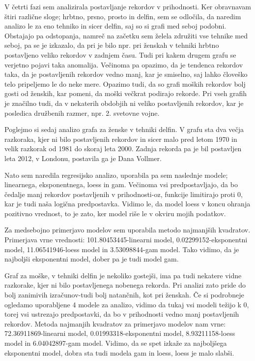 \documentclass[11pt,a4paper]{article}
\begin{document}
V četrti fazi sem analizirala postavljanje rekordov v prihodnosti. Ker obravnavam štiri različne sloge; hrbtno, prsno, prosto in delfin, sem se odločila, da naredim analizo le za eno tehniko in sicer delfin, saj so si grafi med seboj podobni. Obstajajo pa odstopanja, namreč na začetku sem želela združiti vse tehnike med seboj, pa se je izkazalo, da pri je bilo npr. pri ženskah v tehniki hrbtno postavljeno veliko rekordov v zadnjem času. Tudi pri kakem drugem grafu se verjetno pojavi taka anomalija. Večinoma pa opazimo, da je tendenca rekordov taka, da je postavljenih rekordov vedno manj, kar je smiselno, saj lahko človeško telo pripeljemo le do neke mere. Opazimo tudi, da so grafi moških rekordov bolj gosti od ženskih, kar pomeni, da moški večkrat podirajo rekorde. Pri vseh grafih je značilno tudi, da v nekaterih obdobjih ni veliko postavljenih rekordov, kar je posledica družbenih razmer, npr. 2. svetovne vojne.

Poglejmo si sedaj analizo grafa za ženske v tehniki delfin. V grafu sta dva večja razkoraka, kjer ni bilo postavljenih rekordov in sicer malo pred letom 1970 in velik razkorak od 1981 do skoraj leta 2000. Zadnja rekorda pa je bil postavljen leta 2012, v Londonu, postavila ga je Dana Vollmer.

Nato sem naredila regresijsko analizo, uporabila pa sem naslednje modele; linearnega, eksponentnega, loess in gam. Večinoma vsi predpostavljajo, da bo čedalje manj rekordov postavljenih v prihodnosti-oz, funkcije limitirajo proti 0, kar je tudi naša logična predpostavka. Vidimo le, da model loess v koncu ohranja pozitivno vrednost, to je zato, ker model riše le v okviru mojih podatkov.

Za medsebojno primerjavo modelov sem uporabila metodo najmanjših kvadratov. Primerjava vrne vrednosti: 101.80453445-linearni model, 0.02299152-eksponentni model,  11.06541946-loess model in  3.53098844-gam model. Tako vidimo, da je najboljši eksponentni model, dober pa je tudi model gam.


Graf za moške, v tehniki delfin je nekoliko gostejši, ima pa tudi nekatere vidne razkorake, kjer ni bilo postavljenega nobenega rekorda. Pri analizi zato pride do bolj zanimivih izračunov-tudi bolj natančnih, kot pri ženskah. Če si podrobneje ogledamo uporabljene 4 modele za analizo, vidimo da tukaj vsi modeli težijo k 0, torej vsi ustrezajo predpostavki, da bo v prihodnosti vedno manj postavljenih rekordov. Metoda najmanjih kvadratov za primerjavo modelov nam vrne: 72.36911869-linearni model,  0.01993318-eksponentni model,  8.93211158-loess model in 6.04042897-gam model. Vidimo, da se spet izkaže za najboljšega eksponentni model, dobra sta tudi modela gam in loess, loess je malo slabši. 
\end{document}
